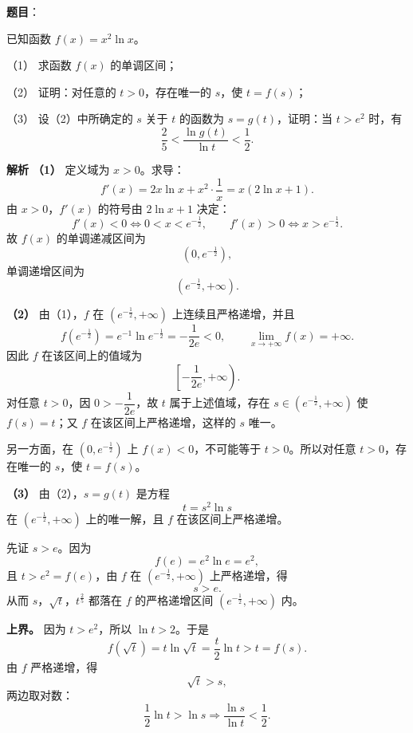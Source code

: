 \begin{answer}

\textbf{题目}：

已知函数 $f(x)=x^2\ln x$。

（1） 求函数 $f(x)$ 的单调区间；

（2） 证明：对任意的 $t>0$，存在唯一的 $s$，使 $t=f(s)$；

（3） 设（2）中所确定的 $s$ 关于 $t$ 的函数为 $s=g(t)$，证明：当 $t>e^2$ 时，有
\nopagebreak[4]
\[\frac25<\frac{\ln g(t)}{\ln t}<\frac12.\]

\textbf{解析}
\textbf{（1）} 定义域为 $x>0$。求导：
\nopagebreak[4]
\[f'(x)=2x\ln x+x^2\cdot\frac1x=x(2\ln x+1).\]
由 $x>0$，$f'(x)$ 的符号由 $2\ln x+1$ 决定：
\nopagebreak[4]
\[f'(x)<0\Longleftrightarrow 0<x<e^{-\frac12},\qquad
f'(x)>0\Longleftrightarrow x>e^{-\frac12}.\]
故 $f(x)$ 的单调递减区间为
\nopagebreak[4]
\[\left(0,e^{-\frac12}\right),\]
单调递增区间为
\nopagebreak[4]
\[\left(e^{-\frac12},+\infty\right).\]

\textbf{（2）} 由（1），$f$ 在 $\left(e^{-\frac12},+\infty\right)$ 上连续且严格递增，并且
\nopagebreak[4]
\[f\left(e^{-\frac12}\right)
=e^{-1}\ln e^{-\frac12}
=-\frac1{2e}<0,\qquad
\lim_{x\to+\infty}f(x)=+\infty.\]
因此 $f$ 在该区间上的值域为
\nopagebreak[4]
\[\left[-\frac1{2e},+\infty\right).\]
对任意 $t>0$，因 $0>-\dfrac1{2e}$，故 $t$ 属于上述值域，存在 $s\in\left(e^{-\frac12},+\infty\right)$ 使 $f(s)=t$；又 $f$ 在该区间上严格递增，这样的 $s$ 唯一。

另一方面，在 $\left(0,e^{-\frac12}\right)$ 上 $f(x)<0$，不可能等于 $t>0$。所以对任意 $t>0$，存在唯一的 $s$，使 $t=f(s)$。

\textbf{（3）} 由（2），$s=g(t)$ 是方程
\nopagebreak[4]
\[t=s^2\ln s\]
在 $\left(e^{-\frac12},+\infty\right)$ 上的唯一解，且 $f$ 在该区间上严格递增。

先证 $s>e$。因为
\nopagebreak[4]
\[f(e)=e^2\ln e=e^2,\]
且 $t>e^2=f(e)$，由 $f$ 在 $\left(e^{-\frac12},+\infty\right)$ 上严格递增，得
\nopagebreak[4]
\[s>e.\]
从而 $s$，$\sqrt t$，$t^{\frac25}$ 都落在 $f$ 的严格递增区间 $\left(e^{-\frac12},+\infty\right)$ 内。

\textbf{上界。} 因为 $t>e^2$，所以 $\ln t>2$。于是
\nopagebreak[4]
\[f(\sqrt t)=t\ln\sqrt t=\frac t2\ln t>t=f(s).\]
由 $f$ 严格递增，得
\nopagebreak[4]
\[\sqrt t>s,\]
两边取对数：
\nopagebreak[4]
\[\frac12\ln t>\ln s
\Longrightarrow \frac{\ln s}{\ln t}<\frac12.\]


\end{answer}
